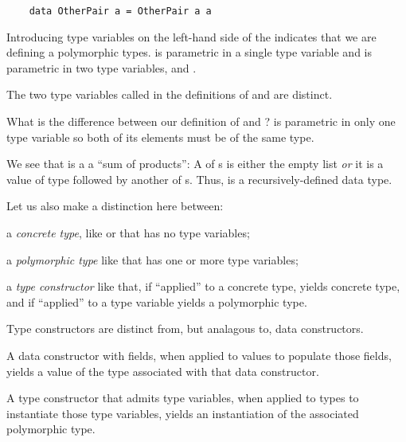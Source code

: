 \begin{notelist}
\begin{lstlisting}
    data OtherPair a = OtherPair a a
    \end{lstlisting}
    \begin{notelist}
        \item Introducing type variables on the left-hand side of the \code{=} indicates that we are
              defining a polymorphic types.  is parametric in a single type variable 
              and  is parametric in two type variables,  and . 
        \item The two type variables called  in the definitions of  and  are
              distinct.
        \item What is the difference between our definition of  and ? 
              is parametric in only one type variable so both of its elements must be of the same type.
        \item We see that  is a a ``sum of products'': A  of s is either
              the empty list  \textit{or} it is a value of type  followed by another
               of s. Thus,  is a recursively-defined data type.
        \item Let us also make a distinction here between:
        \begin{notelist}
            \item a \textit{concrete type}, like  or  that has
                  no type variables;
            \item a \textit{polymorphic type} like  that has one or more type variables;
            \item a \textit{type constructor} like  that, if ``applied'' to a concrete type,
                  yields concrete type, and if ``applied'' to a type variable yields a polymorphic type.
            \begin{notelist}
                \item Type constructors are distinct from, but analagous to, data constructors.
                \item A data constructor with fields, when applied to values to populate those fields, yields a
                      value of the type associated with that data constructor.
                \item A type constructor that admits type variables, when applied to types to instantiate those
                      type variables, yields an instantiation of the associated polymorphic type.
            \end{notelist}
        \end{notelist}
    \end{notelist}
\end{notelist}

